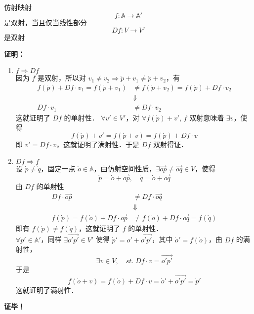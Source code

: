 \begin{theorem}{}\label{AfSp_the1}
仿射映射
\begin{equation}
f:\mathbb A\rightarrow\mathbb A' 
\end{equation}
是双射，当且仅当线性部分
\begin{equation}
Df:V\rightarrow V'
\end{equation}
是双射
\end{theorem}
\textbf{证明：}
\begin{enumerate}
\item $f\Rightarrow Df$\\

因为 $f$ 是双射，所以对 $v_1\neq v_2\Rightarrow \dot p+v_1\neq\dot p+v_2$，有
\begin{equation}
\begin{aligned}
f(\dot p)+Df\cdot v_1=f(\dot p+v_1)&\neq f(\dot p+v_2)=f(\dot p)+Df\cdot v_2\\
&\Downarrow\\
Df\cdot v_1&\neq Df\cdot v_2
\end{aligned}
\end{equation}
这就证明了 $Df$ 的单射性．  $\forall  v'\in V'$，对 $\forall f(\dot p)+v'$, $f$ 双射意味着 $\exists v$，使得 
\begin{equation}
f(\dot p)+v'=f(\dot p+v)=f(\dot p)+Df\cdot v
\end{equation}
即 $v'=Df\cdot v$，这就证明了满射性．于是 $Df$ 双射得证．
\item $Df\Rightarrow f$\\
设 $\dot p\neq \dot q$，固定一点 $\dot o\in \mathbb A$，由仿射空间性质，$\exists \overrightarrow{op}\neq\overrightarrow{oq}\in V$，使得 
\begin{equation}
\dot p=\dot o+\overrightarrow{op},\quad\dot q=\dot o+\overrightarrow{oq} 
\end{equation}
由 $Df$ 的单射性
\begin{equation}
\begin{aligned}
Df\cdot \overrightarrow{op}&\neq Df\cdot \overrightarrow{oq}\\
&\Downarrow\\
f(\dot p)=f(\dot o)+Df\cdot \overrightarrow{op}&\neq f(\dot o)+Df\cdot \overrightarrow{oq}=f(\dot q)
\end{aligned}
\end{equation}
即有 $f(\dot p)\neq f(\dot q)$，这就证明了 $f$ 的单射性．\\

$\forall \dot p'\in\mathbb A'$，同样 $\exists\overrightarrow{o'p'}\in V'$ 使得 $\dot p'=o'+\overrightarrow{o'p'}$，其中 $\dot o'=f(\dot o)$，由 $Df$ 的满射性，
\begin{equation}
\exists v\in V,\quad st.\; Df\cdot v=\overrightarrow{o'p'}
\end{equation}
于是
\begin{equation}
f(\dot o+v)=f(\dot o)+Df\cdot v=\dot o'+\overrightarrow{o'p'}=\dot p'
\end{equation}
这就证明了满射性．
\end{enumerate}
\textbf{证毕！}

